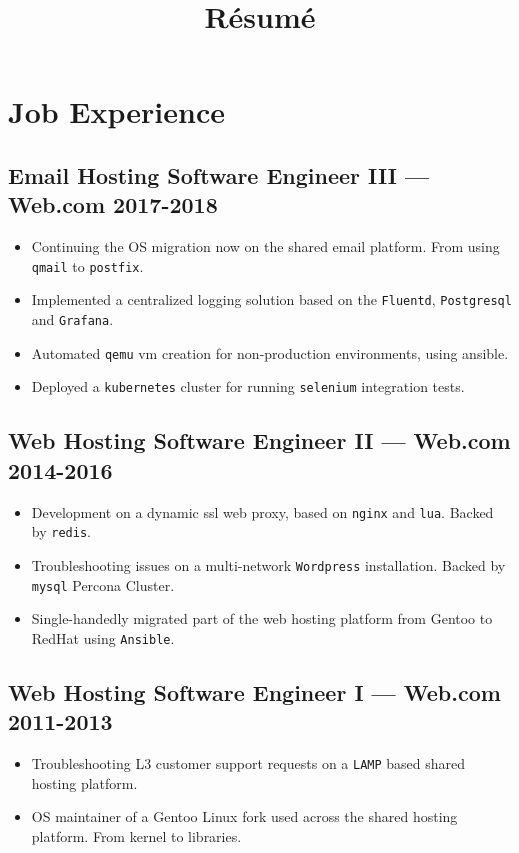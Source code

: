 \documentclass[11pt]{article}
\begin{document}
\title{R\'esum\'e}
\author{\FULLNAME}

\maketitle{\today}


\section{Job Experience}


\subsection{Email Hosting Software Engineer III --- Web.com \hfill 2017-2018}
\begin{itemize}
\item Continuing the OS migration now on the shared email platform. From using \texttt{qmail} to \texttt{postfix}.
\item Implemented a centralized logging solution based on the \texttt{Fluentd}, \texttt{Postgresql} and \texttt{Grafana}.
\item Automated \texttt{qemu} vm creation for non-production environments, using ansible.
\item Deployed a \texttt{kubernetes} cluster for running \texttt{selenium} integration tests.
\end{itemize}

\subsection{Web Hosting Software Engineer II --- Web.com \hfill 2014-2016}
\begin{itemize}
\item Development on a dynamic ssl web proxy, based on \texttt{nginx} and \texttt{lua}. Backed by \texttt{redis}.
\item Troubleshooting issues on a multi-network \texttt{Wordpress} installation. Backed by \texttt{mysql} Percona Cluster.
\item Single-handedly migrated part of the web hosting platform from Gentoo to RedHat using \texttt{Ansible}.
\end{itemize}

\subsection{Web Hosting Software Engineer I --- Web.com \hfill 2011-2013}
\begin{itemize}
\item Troubleshooting L3 customer support requests on a \texttt{LAMP} based shared hosting platform.
\item OS maintainer of a Gentoo Linux fork used across the shared hosting platform. From kernel to libraries.
\end{itemize}
\end{document}
